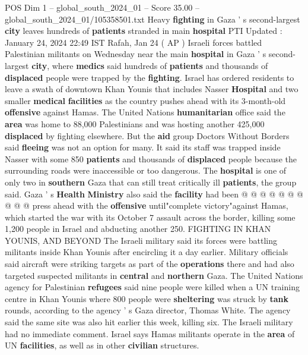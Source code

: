\begin{textsample}{POS Dim 1 – global\_south\_2024\_01 – Score 35.00 – global\_south\_2024\_01/105358501.txt}  \label{ex:f1_pos_116}
Heavy \textbf{fighting} in Gaza ' s second-largest \textbf{city} leaves hundreds of \textbf{patients} stranded in main \textbf{hospital} PTI Updated : January 24, 2024 22:49 IST Rafah, Jan 24 ( AP ) Israeli forces battled Palestinian militants on Wednesday near the main \textbf{hospital} in Gaza ' s second-largest \textbf{city}, where \textbf{medics} said hundreds of \textbf{patients} and thousands of \textbf{displaced} people were trapped by the \textbf{fighting}.
Israel has ordered residents to leave a swath of downtown Khan Younis that includes Nasser \textbf{Hospital} and two smaller \textbf{medical} \textbf{facilities} as the country pushes ahead with its 3-month-old \textbf{offensive} against Hamas.
The United Nations \textbf{humanitarian} office said the \textbf{area} was home to 88,000 Palestinians and was hosting another 425,000 \textbf{displaced} by fighting elsewhere.
But the \textbf{aid} group Doctors Without Borders said \textbf{fleeing} was not an option for many.
It said its staff was trapped inside Nasser with some 850 \textbf{patients} and thousands of \textbf{displaced} people because the surrounding roads were inaccessible or too dangerous.
The \textbf{hospital} is one of only two in \textbf{southern} Gaza that can still treat critically ill \textbf{patients}, the group said.
Gaza ' s \textbf{Health} \textbf{Ministry} also said the \textbf{facility} had been @ @ @ @ @ @ @ @ @ @ press ahead with the \textbf{offensive} until"complete victory"against Hamas, which started the war with its October 7 assault across the border, killing some 1,200 people in Israel and abducting another 250.
FIGHTING IN KHAN YOUNIS, AND BEYOND The Israeli military said its forces were battling militants inside Khan Younis after encircling it a day earlier.
Military officials said aircraft were striking targets as part of the \textbf{operations} there and had also targeted suspected militants in \textbf{central} and \textbf{northern} Gaza.
The United Nations agency for Palestinian \textbf{refugees} said nine people were killed when a UN training centre in Khan Younis where 800 people were \textbf{sheltering} was struck by \textbf{tank} rounds, according to the agency ' s Gaza director, Thomas White.
The agency said the same site was also hit earlier this week, killing six.
The Israeli military had no immediate comment.
Israel says Hamas militants operate in the \textbf{area} of UN \textbf{facilities}, as well as in other \textbf{civilian} structures.

\end{textsample}
